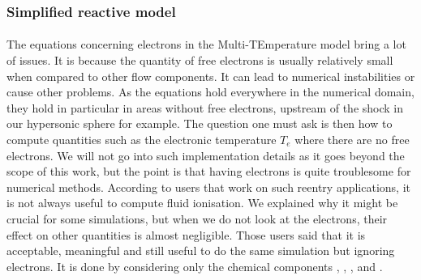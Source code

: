       \subsubsection{Simplified reactive model}

        \paragraph{}
        The equations concerning electrons in the Multi-TEmperature model bring a lot of issues.
        It is because the quantity of free electrons is usually relatively small when compared to other flow components.
        It can lead to numerical instabilities or cause other problems.
        As the equations hold everywhere in the numerical domain, they hold in particular in areas without free electrons, upstream of the shock in our hypersonic sphere for example.
        The question one must ask is then how to compute quantities such as the electronic temperature $T_e$ where there are no free electrons.
        We will not go into such implementation details as it goes beyond the scope of this work, but the point is that having electrons is quite troublesome for numerical methods.
        According to users that work on such reentry applications, it is not always useful to compute fluid ionisation.
        We explained why it might be crucial for some simulations, but when we do not look at the electrons, their effect on other quantities is almost negligible.
        Those users said that  it is acceptable, meaningful and still useful to do the same simulation but ignoring electrons.
        It is done by considering only the chemical components , , ,  and .

